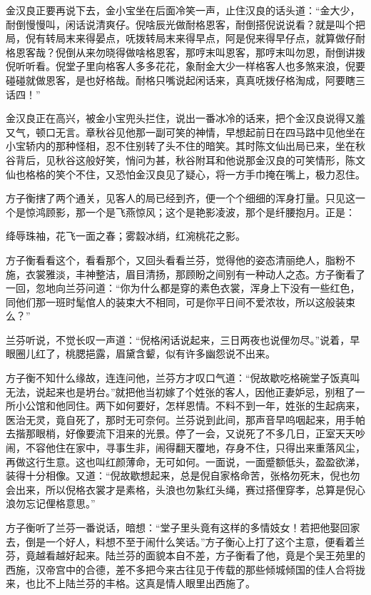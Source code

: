 \documentclass[12pt,UTF8]{ctexbook}
\begin{document}
{{{金汉良正要再说下去，金小宝坐在后面冷笑一声，止住汉良的话头道：“金大少，耐倒慢慢叫，闲话说清爽仔。倪啥辰光做耐格恩客，耐倒搭倪说说看？就是叫个把局，倪有转局末来得晏点，呒拨转局末来得早点，阿是倪来得早仔点，就算做仔耐格恩客哉？倪倒从来勿晓得做啥格恩客，那哼末叫恩客，那哼末叫勿恩，耐倒讲拨倪听听看。倪堂子里向格客人多多花花，象耐金大少一样格客人也多煞来浪，倪要碰碰就做恩客，是也好格哉。耐格只嘴说起闲话来，真真呒拨仔格淘成，阿要瞎三话四！”

金汉良正在高兴，被金小宝兜头拦住，说出一番冰冷的话来，把个金汉良说得又羞又气，顿口无言。章秋谷见他那一副可笑的神情，早想起前日在四马路中见他坐在小宝轿内的那种怪相，忍不住别转了头不住的暗笑。其时陈文仙出局已来，坐在秋谷背后，见秋谷这般好笑，悄问为甚，秋谷附耳和他说那金汉良的可笑情形，陈文仙也格格的笑个不住，又恐怕金汉良见了疑心，将一方手巾掩在嘴上，极力忍住。

方子衡搳了两个通关，见客人的局已经到齐，便一个个细细的浑身打量。只见这一个是惊鸿顾影，那一个是飞燕惊风；这个是艳影凌波，那个是纤腰抱月。正是：

绛辱珠袖，花飞一面之春；雾縠冰绡，红涴桃花之影。

方子衡看看这个，看看那个，又回头看看兰芬，觉得他的姿态清丽绝人，脂粉不施，衣裳雅淡，丰神整洁，眉目清扬，那顾盼之间别有一种动人之态。方子衡看了一回，忽地向兰芬问道：“你为什么都是穿的素色衣裳，浑身上下没有一些红色，同他们那一班时髦倌人的装束大不相同，可是你平日间不爱浓妆，所以这般装束么？”

兰芬听说，不觉长叹一声道：“倪格闲话说起来，三日两夜也说俚勿尽。”说着，早眼圈儿红了，桃腮挹露，眉黛含颦，似有许多幽怨说不出来。

方子衡不知什么缘故，连连问他，兰芬方才叹口气道：“倪故歇吃格碗堂子饭真叫无法，说起来也是坍台。”就把他当初嫁了个姓张的客人，因他正妻妒忌，别租了一所小公馆和他同住。两下如何要好，怎样恩情。不料不到一年，姓张的生起病来，医治无灵，竟自死了，那时无可奈何。兰芬说到此间，那声音早呜咽起来，用手帕去揩那眼梢，好像要流下泪来的光景。停了一会，又说死了不多几日，正室天天吵闹，不容他住在家中，寻事生非，闹得翻天覆地，存身不住，只得出来重落风尘，再做这行生意。这也叫红颜薄命，无可如何。一面说，一面蹙额低头，盈盈欲涕，装得十分相像。又道：“倪故歇想起来，总是倪自家格命苦，张格勿死末，倪也勿会出来，所以倪格衣裳才是素格，头浪也勿紥红头绳，赛过搭俚穿孝，总算是倪心浪勿忘记俚格意思。”

方子衡听了兰芬一番说话，暗想：“堂子里头竟有这样的多情妓女！若把他娶回家去，倒是一个好人，料想不至于闹什么笑话。”方子衡心上打了这个主意，便看着兰芬，竟越看越好起来。陆兰芬的面貌本自不差，方子衡看了他，竟是个吴王苑里的西施，汉帝宫中的合德，差不多把今来古往见于传载的那些倾城倾国的佳人合将拢来，也比不上陆兰芬的丰格。这真是情人眼里出西施了。

}}}
\end{document}
